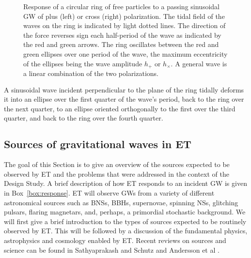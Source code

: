{\begin{figure}[H]
\vskip 0.3cm
\caption{Response of a circular ring of free particles to a passing sinusoidal 
GW of plus (left) or cross (right) polarization.
The tidal field of the waves on the ring is indicated by light dotted 
lines. The direction of the force reverses sign each half-period of 
the wave as indicated by the red  and green arrows. The ring oscillates between
the red and green ellipses over one period of the wave, the maximum 
eccentricity of the ellipses being the wave amplitude $h_+$ or $h_\times$. 
A general wave is a linear combination of the two polarizations.
}
\label{fig:pol}
\end{figure}
\vskip -0.6cm
A sinusoidal wave incident perpendicular to the plane of the ring tidally 
deforms it into an ellipse over the first quarter of the wave's period, back 
to the ring over the next quarter, to an ellipse oriented orthogonally to the 
first over the third quarter, and back to the ring over the fourth quarter. 
}

\clearpage 

\subsection{Sources of gravitational waves in ET}

The goal of this Section is to give an overview of the sources
expected to be observed by ET and the problems that were addressed 
in the context of the Design Study. A brief description of how ET 
responds to an incident GW is given in Box~\ref{box:response}.
ET will observe GWs from a variety of different astronomical 
sources such as BNSs, BBHs, supernovae, spinning NSs,
glitching pulsars, flaring magnetars, and, perhaps, a primordial 
stochastic background.
We will first give a brief introduction to the types of sources
expected to be routinely observed by ET. This will be followed
by a discussion of the fundamental physics, 
astrophysics and cosmology enabled by ET. Recent reviews on sources
and science can be found in Sathyaprakash and Schutz \cite{lrr-2009-2}
and Andersson et al \cite{2011GReGr..43..409A}.

